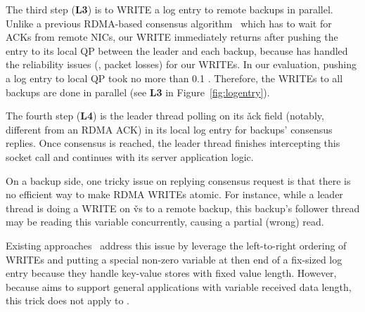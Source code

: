 The third step (\textbf{L3}) is to WRITE a log entry to remote backups 
in parallel. Unlike a previous RDMA-based consensus 
algorithm~\cite{dare:hpdc15} which has to wait for ACKs from remote NICs, our 
WRITE immediately returns after pushing the entry to its local QP between the 
leader and each backup, because \paxos has handled the reliability issues (\eg, 
packet losses) for our WRITEs. In our evaluation, pushing a log entry to local 
QP took no more than 0.1 \us. Therefore, the WRITEs to all backups are done in 
parallel (see \textbf{L3} in Figure~\ref{fig:logentry}).


The fourth step (\textbf{L4}) is the leader thread polling on its \v{ack} 
field (notably, different from an RDMA ACK) in its local log entry for backups' 
consensus replies. Once consensus is reached, the leader thread finishes 
intercepting this \recv socket call and continues with its server application 
logic.
% 


On a backup side, one tricky issue on replying consensus request is that 
there is no efficient way to make RDMA WRITEs atomic. For instance, while a 
leader thread is doing a WRITE on \v{vs} to a remote backup, this backup's 
follower thread may be reading this variable concurrently, causing a partial 
(wrong) read.

Existing approaches~\cite{farm:nsdi14,herd:sigcomm14} address this issue by 
leverage the left-to-right ordering of WRITEs and putting a special non-zero 
variable at then end of a fix-sized log entry because they handle key-value 
stores with fixed value length. However, because \xxx aims to support general 
applications with variable received data length, this trick does not apply to 
\xxx.


